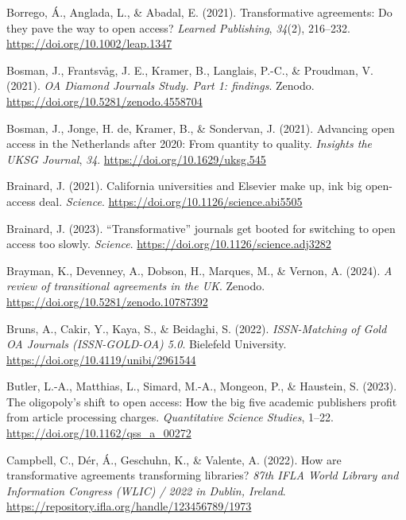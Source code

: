 \documentclass[a4paper,man,floatsintext,longtable,noextraspace,12pt]{apa6}
\newenvironment{CSLReferences}%
  {}%
  {\par}
\begin{document}
\begin{CSLReferences}{1}{0}
\leavevmode{}%
Borrego, Á., Anglada, L., \& Abadal, E. (2021). Transformative
agreements: Do they pave the way to open access? \emph{Learned
Publishing}, \emph{34}(2), 216--232.
\url{https://doi.org/10.1002/leap.1347}

\leavevmode{}%
Bosman, J., Frantsvåg, J. E., Kramer, B., Langlais, P.-C., \& Proudman,
V. (2021). \emph{{OA Diamond Journals Study}. Part 1: findings}. Zenodo.
\url{https://doi.org/10.5281/zenodo.4558704}

\leavevmode{}%
Bosman, J., Jonge, H. de, Kramer, B., \& Sondervan, J. (2021). Advancing
open access in the {Netherlands} after 2020: From quantity to quality.
\emph{Insights the UKSG Journal}, \emph{34}.
\url{https://doi.org/10.1629/uksg.545}

\leavevmode{}%
Brainard, J. (2021). California universities and {Elsevier} make up, ink
big open-access deal. \emph{Science}.
\url{https://doi.org/10.1126/science.abi5505}

\leavevmode{}%
Brainard, J. (2023). {``Transformative''} journals get booted for
switching to open access too slowly. \emph{Science}.
\url{https://doi.org/10.1126/science.adj3282}

\leavevmode{}%
Brayman, K., Devenney, A., Dobson, H., Marques, M., \& Vernon, A.
(2024). \emph{A review of transitional agreements in the {UK}}. Zenodo.
\url{https://doi.org/10.5281/zenodo.10787392}

\leavevmode{}%
Bruns, A., Cakir, Y., Kaya, S., \& Beidaghi, S. (2022).
\emph{{ISSN-Matching of Gold OA Journals (ISSN-GOLD-OA) 5.0}}. Bielefeld
University. \url{https://doi.org/10.4119/unibi/2961544}

\leavevmode{}%
Butler, L.-A., Matthias, L., Simard, M.-A., Mongeon, P., \& Haustein, S.
(2023). The oligopoly's shift to open access: How the big five academic
publishers profit from article processing charges. \emph{Quantitative
Science Studies}, 1--22. \url{https://doi.org/10.1162/qss_a_00272}

\leavevmode{}%
Campbell, C., Dér, Á., Geschuhn, K., \& Valente, A. (2022). How are
transformative agreements transforming libraries? \emph{87th IFLA World
Library and Information Congress (WLIC) / 2022 in Dublin, Ireland}.
\url{https://repository.ifla.org/handle/123456789/1973}


\end{CSLReferences}
\end{document}
